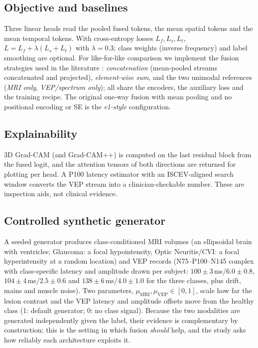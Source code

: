 \subsection{Objective and baselines}
Three linear heads read the pooled fused tokens, the mean spatial tokens and the mean temporal tokens. With cross-entropy losses $L_f,L_s,L_t$, $L=L_f+\lambda(L_s+L_t)$ with $\lambda=0.3$; class weights (inverse frequency) and label smoothing are optional. For like-for-like comparison we implement the fusion strategies used in the literature \cite{zhou2024camf}: \emph{concatenation} (mean-pooled streams concatenated and projected), \emph{element-wise sum}, and the two unimodal references (\emph{MRI only}, \emph{VEP/spectrum only}); all share the encoders, the auxiliary loss and the training recipe. The original one-way fusion with mean pooling and no positional encoding or SE is the \emph{v1-style} configuration.

\subsection{Explainability}
3D Grad-CAM (and Grad-CAM++) is computed on the last residual block from the fused logit, and the attention tensors of both directions are returned for plotting per head. A P100 latency estimator with an ISCEV-aligned search window converts the VEP stream into a clinician-checkable number. These are inspection aids, not clinical evidence.

\subsection{Controlled synthetic generator}\label{sec:synth}
A seeded generator produces class-conditioned MRI volumes (an ellipsoidal brain with ventricles; Glaucoma: a focal hypointensity, Optic Neuritis/CVI: a focal hyperintensity at a random location) and VEP records (N75--P100--N145 complex with class-specific latency and amplitude drawn per subject: $100\pm3$\,ms/$6.0\pm0.8$, $104\pm4$\,ms/$2.5\pm0.6$ and $138\pm6$\,ms/$4.0\pm1.0$ for the three classes, plus drift, mains and muscle noise). Two parameters, $\mu_{\mathrm{MRI}},\mu_{\mathrm{VEP}}\in[0,1]$, scale how far the lesion contrast and the VEP latency and amplitude offsets move from the healthy class (1: default generator; 0: no class signal). Because the two modalities are generated independently given the label, their evidence is complementary by construction; this is the setting in which fusion \emph{should} help, and the study asks how reliably each architecture exploits it.

